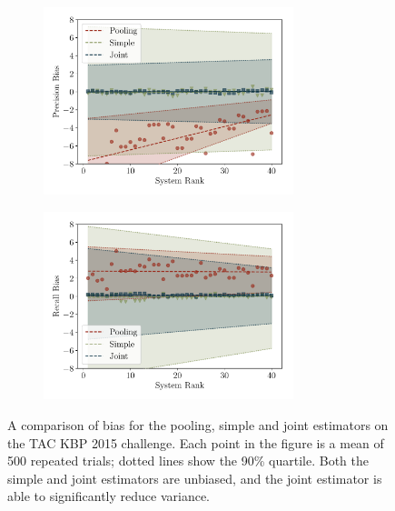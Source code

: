 \begin{figure}[!h]
  \centering

  \begin{subfigure}{\textwidth}
    \centering
    \includegraphics[width=0.8\textwidth]{figures/simulation/simulation-p}
    \caption{}
  \end{subfigure}

  \begin{subfigure}{\textwidth}
    \centering
    \includegraphics[width=0.8\textwidth]{figures/simulation/simulation-r}
    \caption{}
  \end{subfigure}

  \caption[Reduction of variance with the importance-reweighted estimator]{\label{fig:simulation}
  A comparison of bias for the pooling, simple and joint estimators on the TAC KBP 2015 challenge.
  Each point in the figure is a mean of 500 repeated trials; dotted lines show the 90\% quartile.
  Both the simple and joint estimators are unbiased, and the joint estimator is able to significantly reduce variance.
  }
\end{figure}


